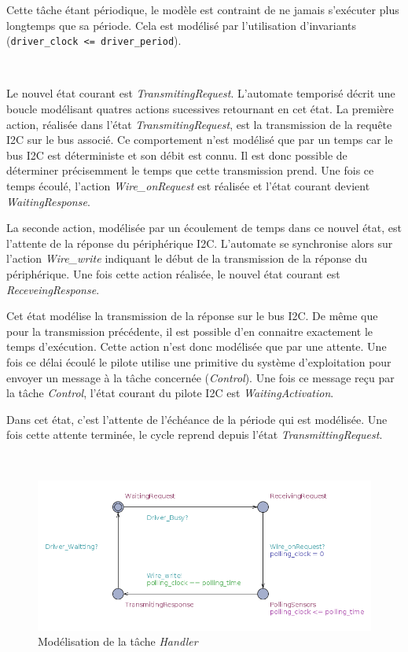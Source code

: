       Cette tâche étant périodique, le modèle est contraint de ne jamais
      s'exécuter plus longtemps que sa période. Cela est modélisé par
      l'utilisation d'invariants ({\tt driver\_clock <= driver\_period}).
      
      ~
      
      Le nouvel état courant est {\it TransmitingRequest}. L'automate temporisé
      décrit une boucle modélisant quatres actions sucessives retournant en cet état. La
      première action, réalisée dans l'état {\it TransmitingRequest}, est la
      transmission de la requête I2C sur le bus associé. Ce comportement n'est
      modélisé que par un temps car le bus I2C est déterministe et son débit
      est connu. Il est donc possible de déterminer précisemment le temps que
      cette transmission prend. Une fois ce temps écoulé, l'action {\it Wire\_onRequest}
      est réalisée et l'état courant devient {\it WaitingResponse}.
      
      La seconde action, modélisée par un écoulement de temps dans ce nouvel état, est
      l'attente de la réponse du périphérique I2C. L'automate se synchronise
      alors sur l'action {\it Wire\_write} indiquant le début de la transmission de la réponse du
      périphérique. Une fois cette action réalisée, le nouvel état courant est
      {\it ReceveingResponse}.
      
      Cet état modélise la transmission de la réponse sur le bus I2C. De même
      que pour la transmission précédente, il est possible d'en connaitre exactement
      le temps d'exécution. Cette action n'est donc modélisée que par une attente. Une fois
      ce délai écoulé le pilote utilise une primitive du système d'exploitation
      pour envoyer un message à la tâche concernée ({\it Control}). Une fois ce
      message reçu par la tâche {\it Control}, l'état courant du pilote I2C est
      {\it WaitingActivation}.
      
      Dans cet état, c'est l'attente de l'échéance de la période qui est
      modélisée. Une fois cette attente terminée, le cycle reprend depuis l'état
      {\it TransmittingRequest}.
      
      ~

      \begin{figure}[!ht]
        \centering
        \includegraphics[scale=0.5]{./img/uppaal-handler.png}
        \caption{Modélisation de la tâche {\it Handler}}
        \label{uppaal-handler}
      \end{figure}


